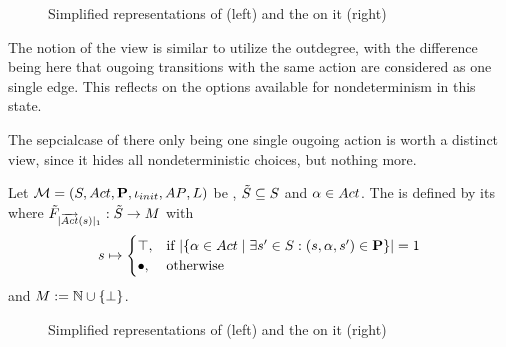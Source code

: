 \documentclass[preview]{standalone}
\begin{document}
\begin{figure}[h]
	\begin{minipage}{.5\textwidth}
		\hspace{5mm}
		
	\end{minipage}%
	\begin{minipage}{.5\textwidth}						
		\centering
		
	\end{minipage}	
	\caption{Simplified representations of \mdp (left) and the \viewN \viewoutactsetsize on it (right)}	
	\label{fig:outActSetSize}  	
\end{figure}

The notion of the view is similar to utilize the outdegree, with the difference being here that ougoing transitions with the same action are considered as one single edge. This reflects on the options available for nondeterminism in this state.

The sepcialcase of there only being one single ougoing action is worth a distinct view, since it hides all nondeterministic choices, but nothing more.

\begin{definition}
	Let ${{{\mathcal{M}}}} = {{({S}, {Act}, {\textbf{P}}, {\iota_{init}}, {AP}, {L})}}$ be \achgphN, ${\tilde{{S}}} \subseteq {S}$ and ${\alpha} \in {Act}$. The \viewN \viewoutactsingle is defined by its \grpfctN where ${{\tilde{F}_{{|{\overrightarrow{{Act}}}({s})|_1}}}} : {\tilde{{S}}} \to {\ensuremath{{M}}}$ with
	\[{s} \mapsto 
	\begin{cases}
		{\top}, &\text{if } |\{{\alpha} \in {Act} \mid \exists {s}' \in {S} : ({s}, {\alpha}, {s}') \in {\ensuremath{{\textbf{P}}}}\}| = 1 \\ 
		{\bullet}, &\text{otherwise}
	\end{cases}
	\]
	and ${{M}} := {\mathbb{N}} \cup {\{\bot\}}$.
\end{definition}

\begin{figure}[h]
	\begin{minipage}{.5\textwidth}
		\hspace{5mm}
		
	\end{minipage}%
	\begin{minipage}{.5\textwidth}						
		\centering
		
	\end{minipage}	
	\caption{Simplified representations of \mdp (left) and the \viewN \viewoutactsetsize on it (right)}	
	\label{fig:outActSingle}  	
\end{figure}
\end{document}
